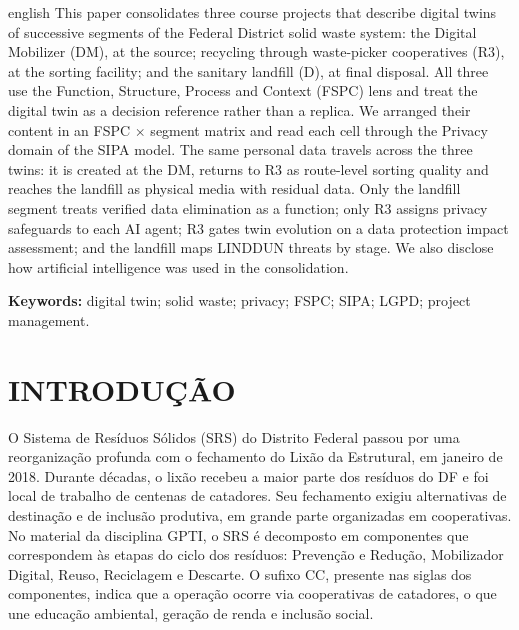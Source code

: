 \documentclass[12pt,a4paper,article,oneside,english,brazil]{abntex2}
\begin{document}
\begin{resumo}[Abstract]
\begin{otherlanguage*}{english}
This paper consolidates three course projects that describe digital twins of successive segments of the Federal District solid waste system: the Digital Mobilizer (DM), at the source; recycling through waste-picker cooperatives (R3), at the sorting facility; and the sanitary landfill (D), at final disposal. All three use the Function, Structure, Process and Context (FSPC) lens and treat the digital twin as a decision reference rather than a replica. We arranged their content in an FSPC $\times$ segment matrix and read each cell through the Privacy domain of the SIPA model. The same personal data travels across the three twins: it is created at the DM, returns to R3 as route-level sorting quality and reaches the landfill as physical media with residual data. Only the landfill segment treats verified data elimination as a function; only R3 assigns privacy safeguards to each AI agent; R3 gates twin evolution on a data protection impact assessment; and the landfill maps LINDDUN threats by stage. We also disclose how artificial intelligence was used in the consolidation.

\vspace{\onelineskip}
\noindent\textbf{Keywords:} digital twin; solid waste; privacy; FSPC; SIPA; LGPD; project management.
\end{otherlanguage*}
\end{resumo}

\newpage

\section{INTRODUÇÃO}

O Sistema de Resíduos Sólidos (SRS) do Distrito Federal passou por uma reorganização profunda com o fechamento do Lixão da Estrutural, em janeiro de 2018. Durante décadas, o lixão recebeu a maior parte dos resíduos do DF e foi local de trabalho de centenas de catadores. Seu fechamento exigiu alternativas de destinação e de inclusão produtiva, em grande parte organizadas em cooperativas. No material da disciplina GPTI, o SRS é decomposto em componentes que correspondem às etapas do ciclo dos resíduos: Prevenção e Redução, Mobilizador Digital, Reuso, Reciclagem e Descarte. O sufixo CC, presente nas siglas dos componentes, indica que a operação ocorre via cooperativas de catadores, o que une educação ambiental, geração de renda e inclusão social.
\end{document}
